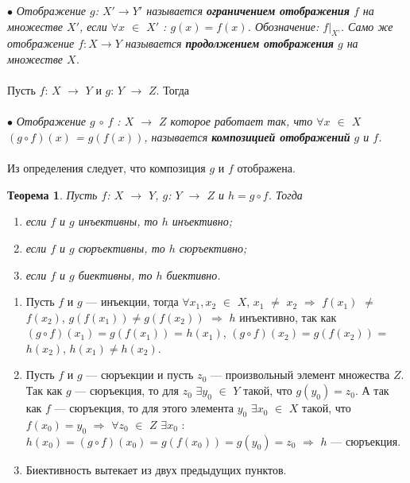 $\bullet$ \textit{Отображение $g$: $X' \rightarrow Y'$ называется \textbf{ограничением отображения} $f$ на множестве $X'$, если $\forall x$ $\in$ $X'$ : $g(x) = f(x)$. Обозначение: $f|_\textit{X'}$. Само же отображение $f:X\rightarrow Y$ называется \textbf{продолжением отображения} $g$ на множестве $X$.}\\\\
Пусть $f$: $X$ $\rightarrow$ $Y$ и $g$: $Y$ $\rightarrow$ $Z$. Тогда\\\\
$\bullet$ \textit{Отображение $g$ $\circ$ $f$ : $X$ $\rightarrow$ $Z$ которое работает так, что $\forall x$ $\in$ $X$ $(g \circ f)(x)$ = $g(f(x))$, называется \textbf{композицией отображений} $g$ и $f$.}\\\\
Из определения следует, что композиция $g$ и $f$ отображена.
\newtheorem*{t6_2}{Теорема}\begin{t6_2} Пусть $f$: $X$ $\rightarrow$ $Y$, $g$: $Y$ $\rightarrow$ $Z$ и $h = g \circ f$. Тогда
	\begin{enumerate}
		\item если $f$ и $g$ инъективны, то $h$ инъективно;
		\item если $f$ и $g$ сюръективны, то $h$ сюръективно;
		\item если $f$ и $g$ биективны, то $h$ биективно.
	\end{enumerate}
\end{t6_2} \begin{Proof} \begin{enumerate}
		\item Пусть $f$ и $g$ --- инъекции, тогда $\forall x_1, x_2$ $\in$ $X$, $x_1$ $\not=$ $x_2$ $\Rightarrow$ $f(x_1)$ $\not=$ $f(x_2)$, $g(f(x_1)) \not= g(f(x_2))$ $\Rightarrow$ $h$ инъективно, так как $(g\circ f)(x_1) = g(f(x_1))$ = $h(x_1)$, $(g\circ f)(x_2) = g(f(x_2))$ = $h(x_2)$, $h(x_1) \not= h(x_2)$.
		\item Пусть $f$ и $g$ --- сюръекции и пусть $z_0$ --- произвольный элемент множества $Z$. Так как $g$ --- сюръекция, то для $z_0$ $\exists y_0$ $\in$ $Y$ такой, что $g(y_0) = z_0$. А так как $f$ --- сюръекция, то для этого элемента $y_0$ $\exists x_0$ $\in$ $X$ такой, что $f(x_0) = y_0$ $\Rightarrow$ $\forall z_0$ $\in$ $Z$ $\exists x_0$ : $h(x_0) = (g \circ f)(x_0) = g(f(x_0)) = g(y_0) = z_0$ $\Rightarrow$ $h$ --- сюръекция.
		\item Биективность вытекает из двух предыдущих пунктов.
\end{enumerate} \end{Proof}\\
